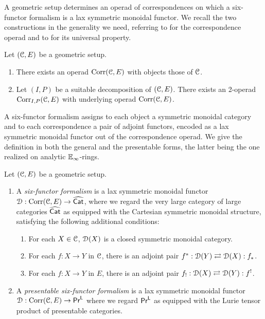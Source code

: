 A geometric setup determines an operad of correspondences on which a six-functor formalism is a lax symmetric monoidal functor. We recall the two constructions in the generality we need, referring to \cite[\S 2]{HeyerMann6FF} for the correspondence operad and to \cite{ConstructionCLL} for its universal property.
\begin{lemma}\label{lem: existence of correspondence operad}
    Let $(\EuScript{C},E)$ be a geometric setup. 
    \begin{enumerate}
        \item There exists an operad $\mathrm{Corr}(\EuScript{C},E)$ with objects those of $\EuScript{C}$. 
        \item Let $(I,P)$ be a suitable decomposition of $(\EuScript{C},E)$. There exists an 2-operad $\mathrm{Corr}_{I,P}(\EuScript{C},E)$ with underlying operad $\mathrm{Corr}(\EuScript{C},E)$. 
    \end{enumerate}
\end{lemma}
A six-functor formalism assigns to each object a symmetric monoidal category and to each correspondence a pair of adjoint functors, encoded as a lax symmetric monoidal functor out of the correspondence operad. We give the definition in both the general and the presentable forms, the latter being the one realized on analytic $\mathbb{E}_{\infty}$-rings.
\begin{definition}\label{def: six-functor formalism}
    Let $(\EuScript{C},E)$ be a geometric setup. 
    \begin{enumerate}
        \item A \emph{six-functor formalism} is a lax symmetric monoidal functor $\EuScript{D}:\mathrm{Corr}(\EuScript{C},E)\to\widehat{\mathsf{Cat}}$, where we regard the very large category of large categories $\widehat{\mathsf{Cat}}$ as equipped with the Cartesian symmetric monoidal structure, satisfying the following additional conditions: 
        \begin{enumerate}[label=(\roman*)]
            \item For each $X\in \EuScript{C}$, $\EuScript{D}(X)$ is a closed symmetric monoidal category. 
            \item For each $f:X\to Y$ in $\EuScript{C}$, there is an adjoint pair $f^{*}:\EuScript{D}(Y)\rightleftarrows\EuScript{D}(X):f_{*}$. 
            \item For each $f:X\to Y$ in $E$, there is an adjoint pair $f_{!}:\EuScript{D}(X)\rightleftarrows\EuScript{D}(Y):f^{!}$. 
        \end{enumerate}
        \item A \emph{presentable six-functor formalism} is a lax symmetric monoidal functor $\EuScript{D}:\mathrm{Corr}(\EuScript{C},E)\to\mathsf{Pr}^{\mathsf{L}}$ where we regard $\mathsf{Pr}^{\mathsf{L}}$ as equipped with the Lurie tensor product of presentable categories.
    \end{enumerate} 
\end{definition}
